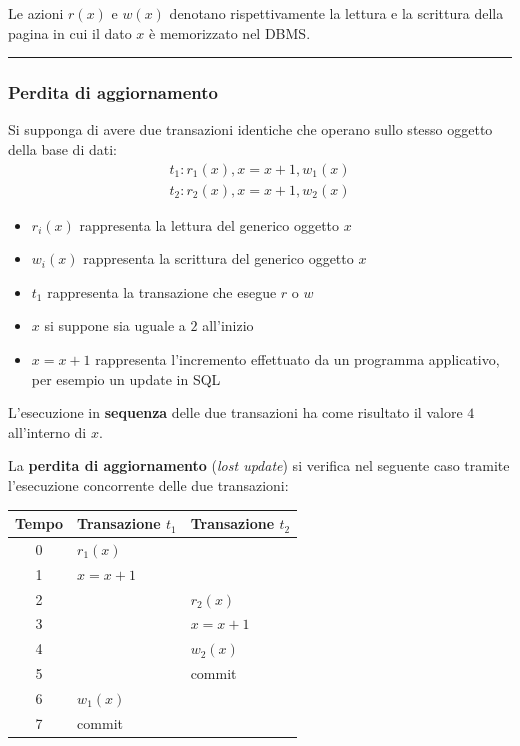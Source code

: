 \documentclass[a4paper]{article}
\newcommand{\longline}{\noindent\rule{\textwidth}{0.4pt}}
\begin{document}
	Le azioni $r\left(x\right)$ e $w\left(x\right)$ denotano rispettivamente la lettura e la scrittura della pagina in cui il dato $x$ è memorizzato nel DBMS.
	
	\longline
	
	\subsubsection{Perdita di aggiornamento}\label{perdita di aggiornamento}
	
	Si supponga di avere due transazioni identiche che operano sullo stesso oggetto della base di dati:
	\begin{gather*}
		t_{1} : r_{1}\left(x\right), x = x + 1, w_{1}\left(x\right) \\
		t_{2} : r_{2}\left(x\right), x = x + 1, w_{2}\left(x\right)
	\end{gather*}
	\begin{itemize}
		\item $r_{i}\left(x\right)$ rappresenta la lettura del generico oggetto $x$
		\item $w_{i}\left(x\right)$ rappresenta la scrittura del generico oggetto $x$
		\item $t_{1}$ rappresenta la transazione che esegue $r$ o $w$
		\item $x$ si suppone sia uguale a $2$ all'inizio
		\item $x = x+1$ rappresenta l'incremento effettuato da un programma applicativo, per esempio un \textsf{update} in SQL
	\end{itemize}
	L'esecuzione in \textbf{sequenza} delle due transazioni ha come risultato il valore $4$ all'interno di $x$.\newline
	
	\noindent
	La \textcolor{Red3}{\textbf{perdita di aggiornamento}} (\emph{lost update}) si verifica nel seguente caso tramite l'esecuzione concorrente delle due transazioni:
	\begin{table}[!htbp]
		\centering
		\begin{tabular}{@{} c l l @{}}
			\toprule
			Tempo & Transazione $t_{1}$ & Transazione $t_{2}$ \\
			\midrule
			0	& $r_{1}\left(x\right)$			& \\
			1	& $x = x + 1$					& \\
			2	&								& $r_{2}\left(x\right)$ \\
			3	&								& $x = x + 1$ \\
			4	&								& $w_{2}\left(x\right)$ \\
			5	&								& \textsf{commit} \\
			6	& $w_{1}\left(x\right)$			& \\
			7	& \textsf{commit}				& \\
			\bottomrule
		\end{tabular}
	\end{table}
\end{document}
